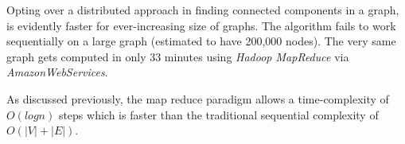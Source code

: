 Opting over a distributed approach in finding connected components in a graph, is evidently faster for ever-increasing size of graphs. The algorithm fails to work sequentially on a large graph (estimated to have 200,000 nodes). The very same graph gets computed in only 33 minutes using \textit{Hadoop MapReduce} via \textit{AmazonWebServices}.

As discussed previously, the map reduce paradigm allows a time-complexity of \textit{$O(logn)$} steps which is faster than the traditional sequential complexity of \textit{$O(|V| + |E|)$}.

